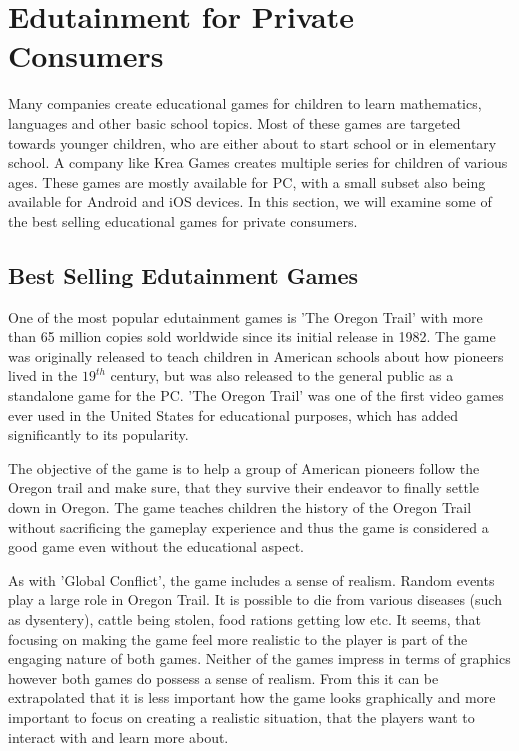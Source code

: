 \section{Edutainment for Private Consumers}
\label{sec:privateconsumers}
Many companies create educational games for children to learn mathematics, languages and other basic school topics.
Most of these games are targeted towards younger children, who are either about to start school or in elementary school.
A company like Krea Games creates multiple series for children of various ages.\cite{kreagames}
These games are mostly available for PC, with a small subset also being available for Android and iOS devices.
In this section, we will examine some of the best selling educational games for private consumers.

\subsection{Best Selling Edutainment Games}
One of the most popular edutainment games is 'The Oregon Trail' with more than 65 million copies sold worldwide since its initial release in 1982.\cite{oregontrail}
The game was originally released to teach children in American schools about how pioneers lived in the $19^{th}$ century, but was also released to the general public as a standalone game for the PC. 'The Oregon Trail' was one of the first video games ever used in the United States for educational purposes, which has added significantly to its popularity.

The objective of the game is to help a group of American pioneers follow the Oregon trail and make sure, that they survive their endeavor to finally settle down in Oregon. The game teaches children the history of the Oregon Trail without sacrificing the gameplay experience and thus the game is considered a good game even without the educational aspect.\newline

As with 'Global Conflict', the game includes a sense of realism.
Random events play a large role in Oregon Trail.
It is possible to die from various diseases (such as dysentery), cattle being stolen, food rations getting low etc.
It seems, that focusing on making the game feel more realistic to the player is part of the engaging nature of both games.
Neither of the games impress in terms of graphics however both games do possess a sense of realism. From this it can be extrapolated that it is less important how the game looks graphically and more important to focus on creating a realistic situation, that the players want to interact with and learn more about.\newline

